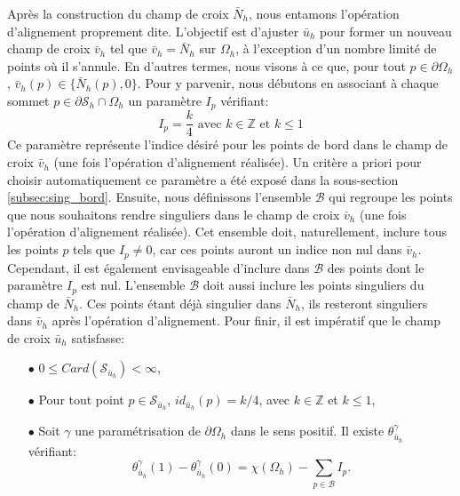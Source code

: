 Après la construction du champ de croix $\bar{N}_h$, nous entamons l'opération d'alignement proprement dite. L'objectif est d'ajuster $\bar{u}_h$ pour former un nouveau champ de croix $\bar{v}_h$ tel que $\bar{v}_h=\bar{N}_h$ sur $\Omega_h$, à l'exception d'un nombre limité de points où il s'annule. En d'autres termes, nous visons à ce que, pour tout $p\in\partial\Omega_h$, $\bar{v}_h(p)\in\{\bar{N}_h(p), 0\}$. Pour y parvenir, nous débutons en associant à chaque sommet $p\in\partial\mathcal{S}_h\cap\Omega_h$ un paramètre $I_p$ vérifiant:
\begin{equation}
I_p=\displaystyle\frac{k}{4}\mbox{ avec }k\in\mathbb{Z}\mbox{ et }k\leq 1
\end{equation}
Ce paramètre représente l'indice désiré pour les points de bord dans le champ de croix $\bar{v}_h$ (une fois l'opération d'alignement réalisée). Un critère a priori pour choisir automatiquement ce paramètre a été exposé dans la sous-section \ref{subsec:sing_bord}. Ensuite, nous définissons l'ensemble $\mathcal{B}$ qui regroupe les points que nous souhaitons rendre singuliers dans le champ de croix $\bar{v}_h$ (une fois l'opération d'alignement réalisée). Cet ensemble doit, naturellement, inclure tous les points $p$ tels que $I_p\neq 0$, car ces points auront un indice non nul dans $\bar{v}_h$. Cependant, il est également envisageable d'inclure dans $\mathcal{B}$ des points dont le paramètre $I_p$ est nul. L'ensemble $\mathcal{B}$ doit aussi inclure les points singuliers du champ de $\bar{N}_h$. Ces points étant déjà singulier dans $\bar{N}_h$, ils resteront singuliers dans $\bar{v}_h$ après l'opération d'alignement. Pour finir, il est impératif que le champ de croix $\bar{u}_h$ satisfasse:\\
\begin{itemize}
 \item[$\bullet$] $0\leq Card(\mathcal{S}_{\bar{u}_h})<\infty$,\\
 \item[$\bullet$] Pour tout point $p\in\mathcal{S}_{\bar{u}_h}$, $id_{\bar{u}_h}(p)=k/4$, avec $k\in\mathbb{Z}$ et $k\leq 1$,\\
 \item[$\bullet$] Soit $\gamma$ une paramétrisation de $\partial\Omega_h$ dans le sens positif. Il existe $\theta_{\bar{u}_h}^\gamma$ vérifiant:
 \begin{equation}
    \label{eqn:etude_hyp_u_simple}
    \theta_{\bar{u}_h}^\gamma(1)-\theta_{\bar{u}_h}^\gamma(0)=\chi(\Omega_h)-\sum_{p\in\mathcal{B}}I_p.
\end{equation}
\end{itemize}
